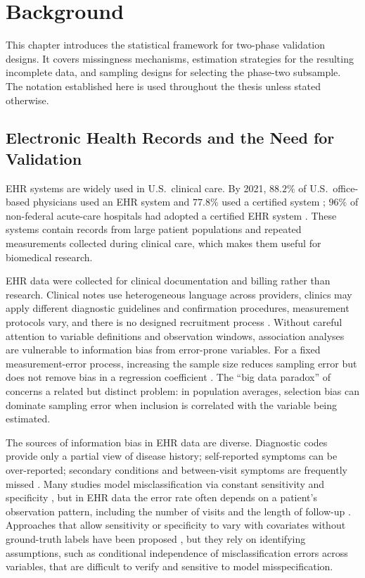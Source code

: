\chapter{Background}
\label{chap:background}

This chapter introduces the statistical framework for two-phase validation designs. It covers missingness mechanisms, estimation strategies for the resulting incomplete data, and sampling designs for selecting the phase-two subsample. The notation established here is used throughout the thesis unless stated otherwise.

\section{Electronic Health Records and the Need for Validation}
\label{sec:Background2.1}

EHR systems are widely used in U.S.\ clinical care. By 2021, $88.2\%$ of U.S.\ office-based physicians used an EHR system and $77.8\%$ used a certified system \citep{cdc_nehrs_2021_weighted}; $96\%$ of non-federal acute-care hospitals had adopted a certified EHR system \citep{onc2022report}. These systems contain records from large patient populations and repeated measurements collected during clinical care, which makes them useful for biomedical research.

EHR data were collected for clinical documentation and billing rather than research. Clinical notes use heterogeneous language across providers, clinics may apply different diagnostic guidelines and confirmation procedures, measurement protocols vary, and there is no designed recruitment process \citep{floyd2012use, beesley2020}. Without careful attention to variable definitions and observation windows, association analyses are vulnerable to information bias from error-prone variables. For a fixed measurement-error process, increasing the sample size reduces sampling error but does not remove bias in a regression coefficient \citep{carroll2006measurement}. The ``big data paradox'' of \citet{meng2018} concerns a related but distinct problem: in population averages, selection bias can dominate sampling error when inclusion is correlated with the variable being estimated.

The sources of information bias in EHR data are diverse. Diagnostic codes provide only a partial view of disease history; self-reported symptoms can be over-reported; secondary conditions and between-visit symptoms are frequently missed \citep{o2005}. Many studies model misclassification via constant sensitivity and specificity \citep{sinnott2014, lange2015, hubbard2015}, but in EHR data the error rate often depends on a patient's observation pattern, including the number of visits and the length of follow-up \citep{goldstein2016}. Approaches that allow sensitivity or specificity to vary with covariates without ground-truth labels have been proposed \citep{beesley2022statistical}, but they rely on identifying assumptions, such as conditional independence of misclassification errors across variables, that are difficult to verify and sensitive to model misspecification.

